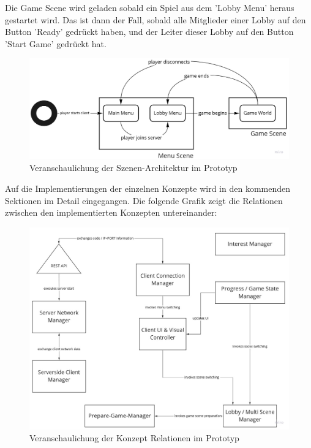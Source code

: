 Die Game Scene wird geladen sobald ein Spiel aus dem 'Lobby Menu' heraus gestartet wird. Das ist dann der Fall, sobald alle Mitglieder einer Lobby auf den Button 'Ready' gedrückt haben, und der Leiter dieser Lobby auf den Button 'Start Game' gedrückt hat. 

\begin{figure}[H]
	\centering
	\includegraphics[width=150mm]{images/scene_architecture.jpg}
	\caption[Architektur Szenen Diagramm]{Veranschaulichung der Szenen-Architektur im Prototyp}
	\label{pic:scene_architecture}
\end{figure}

Auf die Implementierungen der einzelnen Konzepte wird in den kommenden Sektionen im Detail eingegangen. Die folgende Grafik zeigt die Relationen zwischen den implementierten Konzepten untereinander:

\begin{figure}[H]
	\centering
	\includegraphics[width=150mm]{images/concept_relations.jpg}
	\caption[Architektur Konzept Relationen]{Veranschaulichung der Konzept Relationen im Prototyp}
	\label{pic:concept_relations}
\end{figure}

